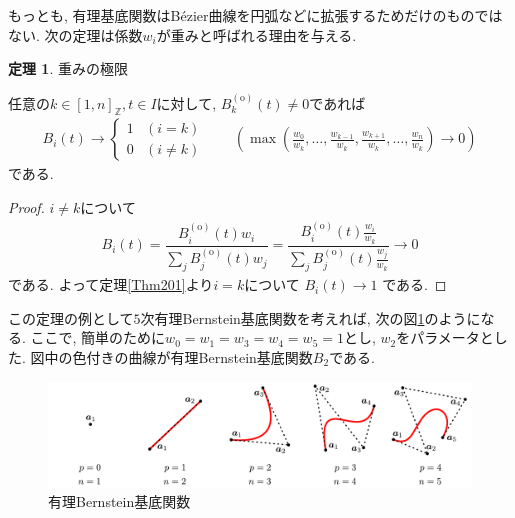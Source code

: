 \documentclass{jsarticle}
\newcommand\Pare[1]{\left(#1\right)}
\newcommand\squa[1]{[#1]}
\newcommand\Z[2]{\squa{#1,#2}_\mathbb{Z}}
\theoremstyle{definition}%
\newtheorem{thm}{定理}
\begin{document}
もっとも, 有理基底関数はB\'ezier曲線を円弧などに拡張するためだけのものではない.
次の定理は係数$w_i$が重みと呼ばれる理由を与える.
\begin{screen}
	\begin{thm}
		重みの極限

		任意の$k\in\Z{1}{n}, t\in I$に対して, $B_{k}^{(\text{o})}(t)\neq 0$であれば
		\begin{align}
			B_i(t)\to
			\begin{cases}
				1 &(i=k) \\
				0 &(i\neq k)
			\end{cases} \qquad
            \Pare{\max\Pare{\frac{w_0}{w_{k}},\dots,\frac{w_{{k}-1}}{w_{k}},\frac{w_{{k}+1}}{w_{k}},\dots,\frac{w_n}{w_{k}}}
			\to
			0}
		\end{align}
		である.
	\end{thm}
\end{screen}
\begin{proof}
	$i\neq k$について
	\begin{align}
		B_i(t)
		=
		\dfrac{B_{i}^{(\text{o})}(t)w_i}{\sum\limits_{j}B_{j}^{(\text{o})}(t)w_j}
		=
		\dfrac{B_{i}^{(\text{o})}(t)\frac{w_i}{w_{k}}}{\sum\limits_{j}B_{j}^{(\text{o})}(t)\frac{w_j}{w_{k}}}
		\to
		0
	\end{align}
	である.
	よって定理\ref{Thm201}より$i=k$について
	$B_i(t)\to 1$
    である.
\end{proof}
\newpage
この定理の例として$5$次有理Bernstein基底関数を考えれば, 次の図\ref{Fig212}のようになる.
ここで, 簡単のために$w_0=w_1=w_3=w_4=w_5=1$とし, $w_2$をパラメータとした.
図中の色付きの曲線が有理Bernstein基底関数$B_2$である.
\addtocounter{footnote}{-1}
\begin{figure}[H]
	\centering
    \includegraphics[page=6,clip,width=160mm]{fig.pdf}
	\caption{有理Bernstein基底関数\protect \footnotemark}
	\label{Fig212}
\end{figure}
\end{document}
